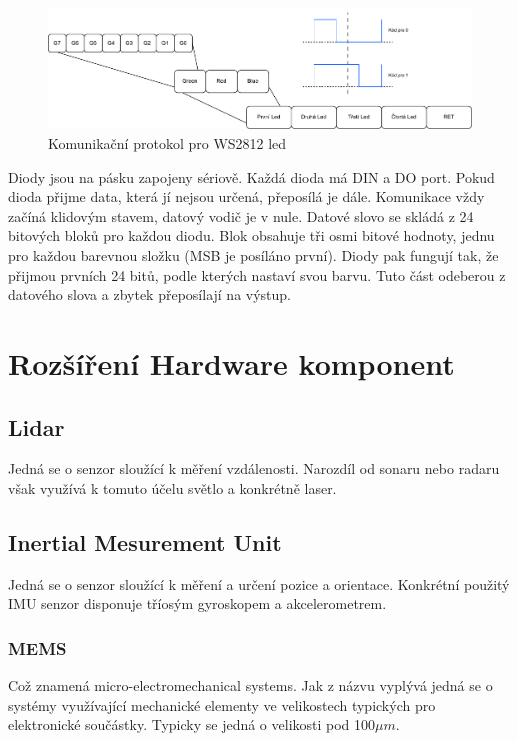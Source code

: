 \begin{figure}[h!]
	\centering
	\includegraphics[scale=0.55]{obrazky-figures/ws2812_led.pdf}
	\caption{Komunikační protokol pro WS2812 led}
	\label{}
\end{figure}

Diody jsou na pásku zapojeny sériově. Každá dioda má DIN a DO port. Pokud dioda přijme data, která jí nejsou určená, přeposílá je dále. Komunikace vždy začíná klidovým stavem, datový vodič je v nule. Datové slovo se skládá z 24 bitových bloků pro každou diodu. Blok obsahuje tři osmi bitové hodnoty, jednu pro každou barevnou složku (MSB je posíláno první). Diody pak fungují tak, že přijmou prvních 24 bitů, podle kterých nastaví svou barvu. Tuto část odeberou z datového slova a zbytek přeposílají na výstup. \cite{ws2812}

\section{Rozšíření Hardware komponent}

\subsection*{Lidar}
Jedná se o senzor sloužící k měření vzdálenosti. Narozdíl od sonaru nebo radaru však využívá k tomuto účelu světlo a konkrétně laser. 

\subsection*{Inertial Mesurement Unit}
Jedná se o senzor sloužící k měření a určení pozice a orientace. Konkrétní použitý IMU senzor disponuje tříosým gyroskopem a akcelerometrem. 

\subsubsection*{MEMS}
Což znamená micro-electromechanical systems. Jak z názvu vyplývá jedná se o systémy využívající mechanické elementy ve velikostech typických pro elektronické součástky. Typicky se jedná o velikosti pod 100$\mu m$.

